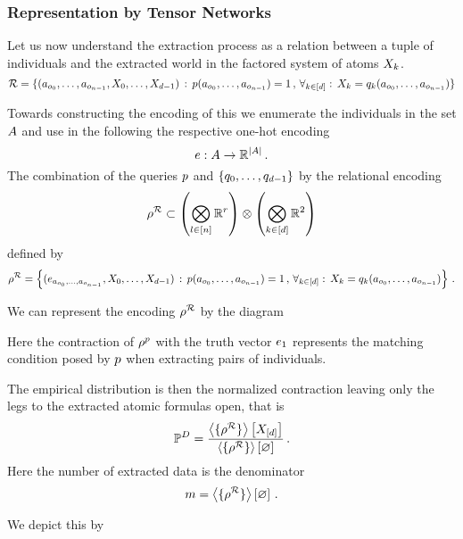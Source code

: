 \subsubsection{Representation by Tensor Networks}

Let us now understand the extraction process as a relation between a tuple of individuals and the extracted world in the factored system of atoms $X_{k}$.
	\[ \mathcal{R}
	= \{ (a_{o_{0}},\ldots,a_{o_{n-1}}, X_{0},\ldots,X_{d-1}) 
	\, : \,  p(a_{o_{0}},\ldots,a_{o_{n-1}}) = 1 \, , \, \forall_{k\in[d]} : \,  X_{k} = q_{k}(a_{o_{0}},\ldots,a_{o_{n-1}}) \}\]
	
Towards constructing the encoding of this we enumerate the individuals in the set $A$ and use in the following the respective one-hot encoding 
	\[ e : A \rightarrow \mathbb{R}^{\left|A\right|} \, . \]
The combination of the queries $p$ and $\{q_{0},\ldots,q_{d-1}\}$ by the relational encoding
	\[\rho^{\mathcal{R}} \subset \left(\bigotimes_{l\in[n]}\mathbb{R}^{r}\right) \otimes \left(\bigotimes_{k\in[d]}\mathbb{R}^2\right) \]
defined by
	\[ \rho^{\mathcal{R}} 
	= \left\{ (e_{a_{o_{0}},\ldots,a_{o_{n-1}}}, X_{0},\ldots,X_{d-1}) 
	\, : \, p(a_{o_{0}},\ldots,a_{o_{n-1}}) = 1 \, , \, \forall_{k\in[d]} : \,  X_{k} = q_{k}(a_{o_{0}},\ldots,a_{o_{n-1}}) \right\} \, . \]

%
We can represent the encoding $\rho^{\mathcal{R}}$ by the diagram
\begin{center}
	
\end{center}
Here the contraction of $\rho^{p}$ with the truth vector $e_1$ represents the matching condition posed by $p$ when extracting pairs of individuals.

The empirical distribution is then the normalized contraction leaving only the legs to the extracted atomic formulas open, that is
\begin{align*}
 	\mathbb{P}^{D} 
	= \frac{
	\left\langle \{\rho^{\mathcal{R}}\}\right\rangle \left[ X_{[d]} \right]
	}{
	\left\langle \{\rho^{\mathcal{R}}\}\right\rangle \left[ \varnothing \right]
	}  \, . 
\end{align*}
Here the number of extracted data is the denominator
	\[ m = \left\langle \{\rho^{\mathcal{R}}\}\right\rangle \left[ \varnothing \right] \, .  \]
	
We depict this by
\begin{center}
	
\end{center}




